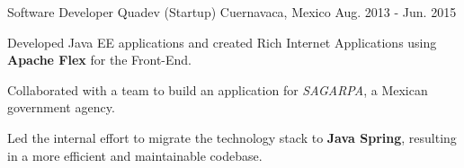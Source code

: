 \begin{cventries}
\cventry
{Software Developer} %
{Quadev (Startup)} %
{Cuernavaca, Mexico} %
{Aug. 2013 - Jun. 2015} %
{
    \begin{cvitems}
      \item {Developed Java EE applications and created Rich Internet Applications using \textbf{Apache Flex} for the Front-End.}
      \item {Collaborated with a team to build an application for \textit{SAGARPA}, a Mexican government agency.}
      \item {Led the internal effort to migrate the technology stack to \textbf{Java Spring}, 
      resulting in a more efficient and maintainable codebase.}
    \end{cvitems}
}

\end{cventries}